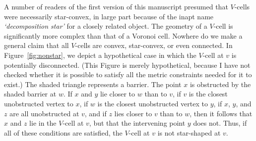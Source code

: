 \begin{remark}\label{remark:pathology}
A number of readers of the first version of this manuscript
presumed that $V$-cells were necessarily star-convex, in large
part because of the inapt name {\it `decomposition star'\/} for a
closely related object. The geometry of a $V$-cell is
significantly more complex than that of a Voronoi cell. Nowhere do
we make a general claim that all $V$-cells are convex,
star-convex, or even connected.  In Figure~\ref{fig:nonstar}, we
depict a hypothetical case in which the $V$-cell at $v$ is
potentially disconnected.  (This Figure is merely hypothetical,
because I have not checked whether it is possible to satisfy all
the metric constraints needed for it to exist.)  The shaded
triangle represents a barrier.  The point $x$ is obstructed by the
shaded barrier at $w$.  If $x$ and $y$ lie closer to $w$ than to
$v$, if $v$ is the closest unobstructed vertex to $x$, if $w$ is
the closest unobstructed vertex to $y$, if $x$, $y$, and $z$ are
all unobstructed at $v$, and if $z$ lies closer to $v$ than to
$w$, then it follows that $x$ and $z$ lie in the $V$-cell at $v$,
but that the intervening point $y$ does not.  Thus, if all of
these conditions are satisfied, the $V$-cell at $v$ is not
star-shaped at $v$.
\end{remark}




